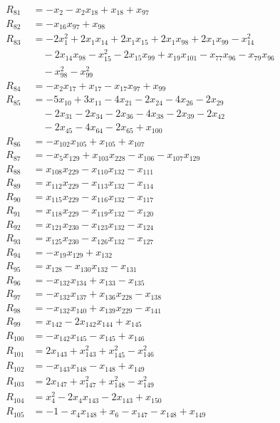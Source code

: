 \begin{align*}
R_{81}&=-x_{2}-x_{2}x_{18}+x_{18}+x_{97}\\
R_{82}&=-x_{16}x_{97}+x_{98}\\
R_{83}&=-2x_{1}^{2}+2x_{1}x_{14}+2x_{1}x_{15}+2x_{1}x_{98}+2x_{1}x_{99}-x_{14}^{2}\\
&\quad{}-2x_{14}x_{98}-x_{15}^{2}-2x_{15}x_{99}+x_{19}x_{101}-x_{77}x_{96}-x_{79}x_{96}\\
&\quad{}-x_{98}^{2}-x_{99}^{2}\\
R_{84}&=-x_{2}x_{17}+x_{17}-x_{17}x_{97}+x_{99}\\
R_{85}&=-5x_{10}+3x_{11}-4x_{21}-2x_{24}-4x_{26}-2x_{29}\\
&\quad{}-2x_{31}-2x_{34}-2x_{36}-4x_{38}-2x_{39}-2x_{42}\\
&\quad{}-2x_{45}-4x_{64}-2x_{65}+x_{100}\\
R_{86}&=-x_{102}x_{105}+x_{105}+x_{107}\\
R_{87}&=-x_{5}x_{129}+x_{103}x_{228}-x_{106}-x_{107}x_{129}\\
R_{88}&=x_{108}x_{229}-x_{110}x_{132}-x_{111}\\
R_{89}&=x_{112}x_{229}-x_{113}x_{132}-x_{114}\\
R_{90}&=x_{115}x_{229}-x_{116}x_{132}-x_{117}\\
R_{91}&=x_{118}x_{229}-x_{119}x_{132}-x_{120}\\
R_{92}&=x_{121}x_{230}-x_{123}x_{132}-x_{124}\\
R_{93}&=x_{125}x_{230}-x_{126}x_{132}-x_{127}\\
R_{94}&=-x_{19}x_{129}+x_{132}\\
R_{95}&=x_{128}-x_{130}x_{132}-x_{131}\\
R_{96}&=-x_{132}x_{134}+x_{133}-x_{135}\\
R_{97}&=-x_{132}x_{137}+x_{136}x_{228}-x_{138}\\
R_{98}&=-x_{132}x_{140}+x_{139}x_{229}-x_{141}\\
R_{99}&=x_{142}-2x_{142}x_{144}+x_{145}\\
R_{100}&=-x_{142}x_{145}-x_{145}+x_{146}\\
R_{101}&=2x_{143}+x_{143}^{2}+x_{145}^{2}-x_{146}^{2}\\
R_{102}&=-x_{143}x_{148}-x_{148}+x_{149}\\
R_{103}&=2x_{147}+x_{147}^{2}+x_{148}^{2}-x_{149}^{2}\\
R_{104}&=x_{4}^{2}-2x_{4}x_{143}-2x_{143}+x_{150}\\
R_{105}&=-1-x_{4}x_{148}+x_{6}-x_{147}-x_{148}+x_{149}\\

\end{align*}
